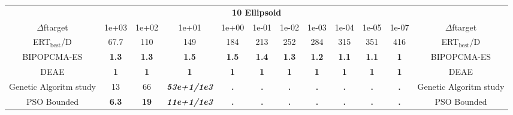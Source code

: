 \begin{tabular}{cccccccccccc}
 & \multicolumn{10}{c}{{\normalsize \textbf{10 Ellipsoid}}}\\
$\Delta$ftarget& 1e+03& 1e+02& 1e+01& 1e+00& 1e-01& 1e-02& 1e-03& 1e-04& 1e-05& 1e-07 & $\Delta$ftarget \\
ERT$_{\textrm{best}}$/D& 67.7& 110& 149& 184& 213& 252& 284& 315& 351& 416 & ERT$_{\textrm{best}}$/D \\
\hline
BIPOPCMA-ES & \textbf{1.3} & \textbf{1.3} & \textbf{1.5} & \textbf{1.5} & \textbf{1.4} & \textbf{1.3} & \textbf{1.2} & \textbf{1.1} & \textbf{1.1} & \textbf{1} & BIPOPCMA-ES \cite{add_an_entry_for_BIPOPCMA-ES_in_bbob.bib}\\
DEAE & \textbf{1} & \textbf{1} & \textbf{1} & \textbf{1} & \textbf{1} & \textbf{1} & \textbf{1} & \textbf{1} & \textbf{1} & \textbf{1} & DEAE \cite{add_an_entry_for_DEAE_in_bbob.bib}\\
Genetic Algoritm study & 13 & 66 & \textbf{\textit{53e+1}\textit{/1e3}} & \textbf{.} & \textbf{.} & \textbf{.} & \textbf{.} & \textbf{.} & \textbf{.} & \textbf{.} & Genetic Algoritm study \cite{add_an_entry_for_Genetic Algoritm study_in_bbob.bib}\\
PSO Bounded & \textbf{6.3} & \textbf{19} & \textbf{\textit{11e+1}\textit{/1e3}} & \textbf{.} & \textbf{.} & \textbf{.} & \textbf{.} & \textbf{.} & \textbf{.} & \textbf{.} & PSO Bounded \cite{add_an_entry_for_PSO Bounded_in_bbob.bib}
\end{tabular}
